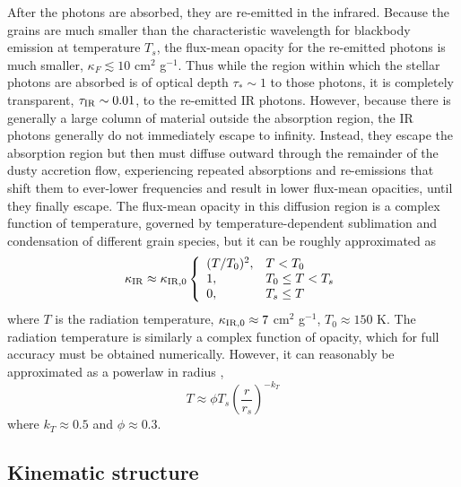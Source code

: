 \documentclass[useAMS,usenatbib]{mn2e}
\begin{document}
After the photons are absorbed, they are re-emitted in the infrared. Because the grains are much smaller than the characteristic wavelength for blackbody emission at temperature $T_s$, the flux-mean opacity for the re-emitted photons is much smaller, $\kappa_F \lesssim 10$ cm$^2$ g$^{-1}$. Thus while the region within which the stellar photons are absorbed is of optical depth $\tau_* \sim 1$ to those photons, it is completely transparent, $\tau_{\rm IR} \sim 0.01$, to the re-emitted IR photons. However, because there is generally a large column of material outside the absorption region, the IR photons generally do not immediately escape to infinity. Instead, they escape the absorption region but then must diffuse outward through the remainder of the dusty accretion flow, experiencing repeated absorptions and re-emissions that shift them to ever-lower frequencies and result in lower flux-mean opacities, until they finally escape. The flux-mean opacity in this diffusion region is a complex function of temperature, governed by temperature-dependent sublimation and condensation of different grain species, but it can be roughly approximated as \citep{semenov03a}
\begin{equation}
\label{eq:IR_opacity}
\kappa_{\rm IR} \approx \kappa_{\rm IR,0}
\left\{
\begin{array}{ll}
(T/T_0)^2, & T < T_0 \\
1, & T_0 \leq T < T_s \\
0, & T_s \leq T
\end{array}
\right.
\end{equation}
where $T$ is the radiation temperature, $\kappa_{\rm IR,0} \approx 7$ cm$^2$ g$^{-1}$, $T_0 \approx 150$ K. The radiation temperature is similarly a complex function of opacity, which for full accuracy must be obtained numerically. However, it can reasonably be approximated as a powerlaw in radius \citep[e.g.,][]{wolfire86a, chakrabarti05a, chakrabarti08a},
\begin{equation}
\label{eq:tprof}
T \approx \phi T_s \left(\frac{r}{r_s}\right)^{-k_T}
\end{equation}
where $k_T \approx 0.5$ and $\phi \approx 0.3$.


\subsection{Kinematic structure}
\end{document}
